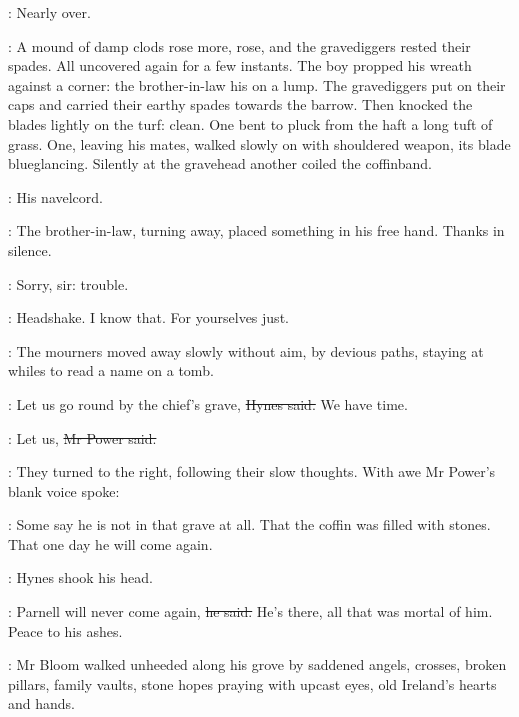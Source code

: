 \BloomInt:
Nearly over.

:
A mound of damp clods rose more, rose,
and the gravediggers rested their spades.
All uncovered again for a few instants.
The boy propped his wreath against a corner:
the brother-in-law his on a lump.
The gravediggers put on their caps and carried their earthy spades towards the barrow.
Then knocked the blades lightly on the turf:
clean.
One bent to pluck from the haft a long tuft of grass.
One, leaving his mates, walked slowly on with shouldered weapon,
its blade blueglancing.
Silently at the gravehead
another coiled the coffinband.

\BloomInt:
His navelcord.

:
The brother-in-law, turning away,
placed something in his free hand.
Thanks in silence.

:
Sorry, sir:
trouble.

:
Headshake.
I know that.
For yourselves just.

:
The mourners moved away slowly without aim, by devious paths,
staying at whiles to read a name on a tomb.

\hynes:
Let us go round by the chief's grave,
\sout{Hynes said.}
We have time.

\power:
Let us,
\sout{Mr Power said.}

:
They turned to the right, following their slow thoughts.
With awe Mr Power's blank voice spoke:

\power:
Some say he is not in that grave at all.
That the coffin was filled with stones.
That one day he will come again.

:
Hynes shook his head.

\hynes:
Parnell will never come again,
\sout{he said.}
He's there, all that was mortal of him.
Peace to his ashes.

:
Mr Bloom walked unheeded along his grove
by saddened angels, crosses, broken pillars,
family vaults,
stone hopes praying with upcast eyes,
old Ireland's hearts and hands.

